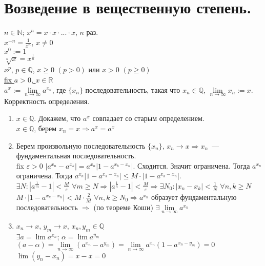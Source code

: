 \documentclass[12pt]{article}
\begin{document}
	\section{Возведение в вещественную степень.}
	$n \in \mathbb{N}$; $x^n = x \cdot x \cdot ... \cdot x$, $n$ раз. \\
	$x^{-n} = \frac{1}{x^n}$, $x \not= 0$ \\
	$x^0 := 1$ \\
	$\sqrt[n]{x} = x^{\frac{1}{n}}$ \\
	$x^p$, $p \in \mathbb{Q}$, $x \geqslant 0$ $(p > 0)$ или $x > 0$ $(p \geqslant 0)$ \\
	\underline{fix $a > 0$, $x \in \mathbb{R}$} \\
	$a^x := \lim \limits_{n \rightarrow \infty} a^{x_n}$, где $\{x_n\}$ последовательность, такая что $x_n \in \mathbb{Q}$, $\lim \limits_{n \rightarrow \infty} x_n := x$. \\
	Корректность определения.
	\begin{enumerate}
		\item $x \in \mathbb{Q}$. Докажем, что $a^x$ совпадает со старым определением. \\
		$x \in \mathbb{Q}$, берем $x_n = x \Rightarrow a^x = a^x$
		\item Берем произвольную последовательность $\{x_n\}$, $x_n \rightarrow x \Rightarrow x_n$~--- фундаментальная последовательность. \\
		fix $\varepsilon > 0$ $|a^{x_n} - a^{x_k}| = a^{x_n}|1 - a^{x_k - x_n}|$. Сходится. Значит ограничена. Тогда $a^{x_n}$ ограничена. Тогда $a^{x_n}|1 - a^{x_k - x_n}| \leqslant M \cdot |1 - a^{x_k - x_n}|$. \\
		$\exists N: |a^{\frac{1}{m}} - 1| < \frac{M}{\varepsilon}$ $\forall m \geqslant N \Rightarrow |a^{\frac{1}{n}} - 1| < \frac{M}{\varepsilon} \Rightarrow \exists N_0: |x_n - x_k| < \frac{1}{N}$ $\forall n, k \geqslant N$ \\
		$M \cdot |1 - a^{x_k - x_n}| < M \cdot \frac{2}{M}$ $\forall n, k \geqslant N_0 \Rightarrow a^{x_n}$ образует фундаментальную последовательность $\Rightarrow$ (по теореме Коши) $\exists \lim \limits_{n \rightarrow \infty} a^{x_n}$
		\item $x_n \rightarrow x$, $y_m \rightarrow x$, $x_n, y_m \in \mathbb{Q}$ \\
		$\exists a = \lim a^{x_n}$; $\alpha = \lim a^{y_m}$ \\
		$(a - \alpha) = \lim \limits_{n \rightarrow \infty} (a^{x_n} - a^{y_m}) = \lim \limits_{n \rightarrow \infty} a^{x_n} (1 - a^{x_n - y_m}) = 0$ \\
		$\lim(y_n - x_n) = x - x = 0$
	\end{enumerate}
\end{document}
